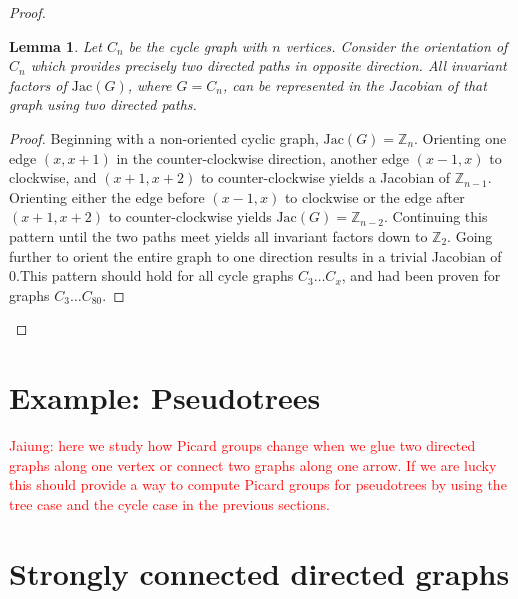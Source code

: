 \documentclass[11pt,reqno]{amsart}
\newcommand{\Jac}{\textrm{Jac}}{}
\theoremstyle{definition}
\theoremstyle{plain}
\newtheorem{lem}[mydef]{\textbf{Lemma}}
\begin{document}
\begin{proof}
		\begin{lem}
			Let $C_n$ be the cycle graph with $n$ vertices. Consider the orientation of $C_n$ which provides precisely
			two directed paths in opposite direction. All invariant factors of $\Jac(G)$, where $G = C_n$, can 
			be represented in the Jacobian of that graph using two directed paths.
		\end{lem}
		\begin{proof}
			Beginning with a non-oriented cyclic graph, $\Jac(G) = \mathbb{Z}_n$.
			Orienting one edge $(x, x+1)$ in the counter-clockwise direction, another edge $(x-1, x)$ to clockwise,
			and $(x+1, x+2)$ to counter-clockwise yields a Jacobian of $\mathbb{Z}_{n-1}$.
			Orienting either the edge before $(x-1, x)$ to clockwise or the edge after $(x+1, x+2)$ to
			counter-clockwise yields $\Jac(G) = \mathbb{Z}_{n-2}$.  Continuing this pattern until the two paths
			meet yields all invariant factors down to $\mathbb{Z}_2$.  Going further to orient the entire
			graph to one direction results in a trivial Jacobian of ${0}$.This pattern should hold for all
			cycle graphs $C_3 \dots C_x$, and had been proven for graphs $C_3 \dots C_{80}$.
		\end{proof}
	\end{proof}

\section{Example: Pseudotrees}

	\textcolor{red}{Jaiung: here we study how Picard groups change when we glue two directed graphs along one vertex or
		connect two graphs along one arrow. If we are lucky this should provide a way to compute Picard groups for
		pseudotrees by using the tree case and the cycle case in the previous sections.}

\section{Strongly connected directed graphs}



\end{document}
